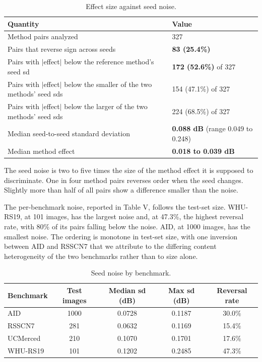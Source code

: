 \documentclass[journal,twoside,10pt]{IEEEtran}
\newlength{\tblavail}
\begin{document}
\begin{table}[!t]
\caption{Effect size against seed noise.}
\label{tab:IV}
\centering
\small
\setlength{\tabcolsep}{3pt}
\setlength{\tblavail}{\dimexpr\columnwidth-4\tabcolsep\relax}
\begin{tabular}{p{0.640\tblavail}p{0.330\tblavail}}
\hline
Quantity & Value \\
\hline
Method pairs analyzed & 327 \\
Pairs that reverse sign across seeds & \textbf{83 (25.4\%)} \\
Pairs with $|$effect$|$ below the reference method's seed sd & \textbf{172 (52.6\%)} of 327 \\
Pairs with $|$effect$|$ below the smaller of the two methods' seed sds & 154 (47.1\%) of 327 \\
Pairs with $|$effect$|$ below the larger of the two methods' seed sds & 224 (68.5\%) of 327 \\
Median seed-to-seed standard deviation & \textbf{0.088 dB} (range 0.049 to 0.248) \\
Median method effect & \textbf{0.018 to 0.039 dB} \\
\hline
\end{tabular}
\end{table}

The seed noise is two to five times the size of the method effect it is supposed to discriminate. One in four method pairs reverses order when the seed changes. Slightly more than half of all pairs show a difference smaller than the noise.

The per-benchmark noise, reported in Table V, follows the test-set size. WHU-RS19, at 101 images, has the largest noise and, at 47.3\%, the highest reversal rate, with 80\% of its pairs falling below the noise. AID, at 1000 images, has the smallest noise. The ordering is monotone in test-set size, with one inversion between AID and RSSCN7 that we attribute to the differing content heterogeneity of the two benchmarks rather than to size alone.

\begin{table}[!t]
\caption{Seed noise by benchmark.}
\label{tab:V}
\centering
\small
\setlength{\tabcolsep}{3pt}
\setlength{\tblavail}{\dimexpr\textwidth-10\tabcolsep\relax}
\begin{tabular}{lcccc}
\hline
Benchmark & Test images & Median sd (dB) & Max sd (dB) & Reversal rate \\
\hline
AID & 1000 & 0.0728 & 0.1187 & 30.0\% \\
RSSCN7 & 281 & 0.0632 & 0.1169 & 15.4\% \\
UCMerced & 210 & 0.1070 & 0.1701 & 17.6\% \\
WHU-RS19 & 101 & 0.1202 & 0.2485 & 47.3\% \\
\hline
\end{tabular}
\end{table}
\end{document}

